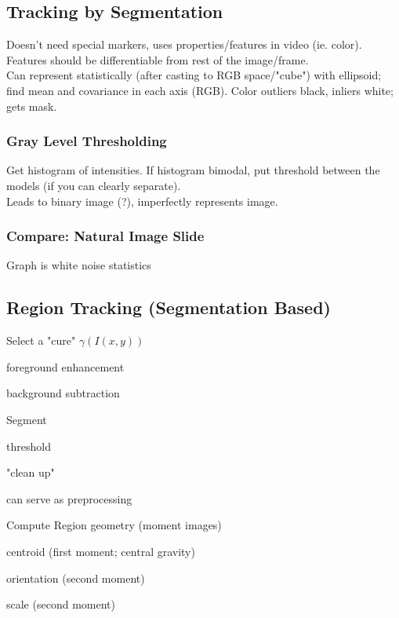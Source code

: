 \documentclass{article}
\begin{document}
\subsection{Tracking by Segmentation}
Doesn't need special markers, uses properties/features in video (ie. color).
\\
Features should be differentiable from rest of the image/frame. \\
Can represent statistically (after casting to RGB space/"cube")
with ellipsoid; find mean and covariance in each axis (RGB). 
Color outliers black, inliers white; gets mask.


\subsubsection{Gray Level Thresholding}
Get histogram of intensities.
If histogram bimodal, put threshold between the models (if you can clearly separate).
\\
Leads to binary image (?), imperfectly represents image.

\subsubsection{Compare: Natural Image Slide}
Graph is white noise statistics

\subsection{Region Tracking (Segmentation Based)}
Select a "cure" $\gamma (I(x,y))$
\begin{list}{}{}
    \item foreground enhancement
    \item background subtraction
\end{list}
Segment
\begin{list}{}{}
    \item threshold
    \item "clean up"
    \item can serve as preprocessing
\end{list}
Compute Region geometry (moment images)
\begin{list}{}{}
    \item centroid (first moment; central gravity)
    \item orientation (second moment)
    \item scale (second moment)
\end{list}
\end{document}
